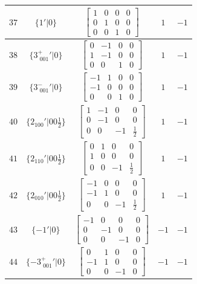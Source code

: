\documentclass[fleqn,8pt]{jsarticle}
\begin{document}
\begin{longtable}{ccccc}
$ 37 $ & $ \{1{}'|0\} $ & $ \begin{bmatrix} 1 & 0 & 0 & 0 \\ 0 & 1 & 0 & 0 \\ 0 & 0 & 1 & 0 \end{bmatrix} $ & $ 1 $ & $ -1 $ \\ \hline
$ 38 $ & $ \{3^{+}_{\,\,001}{}'|0\} $ & $ \begin{bmatrix} 0 & -1 & 0 & 0 \\ 1 & -1 & 0 & 0 \\ 0 & 0 & 1 & 0 \end{bmatrix} $ & $ 1 $ & $ -1 $ \\ \hline
$ 39 $ & $ \{3^{-}_{\,\,001}{}'|0\} $ & $ \begin{bmatrix} -1 & 1 & 0 & 0 \\ -1 & 0 & 0 & 0 \\ 0 & 0 & 1 & 0 \end{bmatrix} $ & $ 1 $ & $ -1 $ \\ \hline
$ 40 $ & $ \{2{}_{100}{}'|0 0 \frac{1}{2}\} $ & $ \begin{bmatrix} 1 & -1 & 0 & 0 \\ 0 & -1 & 0 & 0 \\ 0 & 0 & -1 & \frac{1}{2} \end{bmatrix} $ & $ 1 $ & $ -1 $ \\ \hline
$ 41 $ & $ \{2{}_{110}{}'|0 0 \frac{1}{2}\} $ & $ \begin{bmatrix} 0 & 1 & 0 & 0 \\ 1 & 0 & 0 & 0 \\ 0 & 0 & -1 & \frac{1}{2} \end{bmatrix} $ & $ 1 $ & $ -1 $ \\ \hline
$ 42 $ & $ \{2{}_{010}{}'|0 0 \frac{1}{2}\} $ & $ \begin{bmatrix} -1 & 0 & 0 & 0 \\ -1 & 1 & 0 & 0 \\ 0 & 0 & -1 & \frac{1}{2} \end{bmatrix} $ & $ 1 $ & $ -1 $ \\ \hline
$ 43 $ & $ \{-1{}'|0\} $ & $ \begin{bmatrix} -1 & 0 & 0 & 0 \\ 0 & -1 & 0 & 0 \\ 0 & 0 & -1 & 0 \end{bmatrix} $ & $ -1 $ & $ -1 $ \\ \hline
$ 44 $ & $ \{-3^{+}_{\,\,001}{}'|0\} $ & $ \begin{bmatrix} 0 & 1 & 0 & 0 \\ -1 & 1 & 0 & 0 \\ 0 & 0 & -1 & 0 \end{bmatrix} $ & $ -1 $ & $ -1 $ \\ \hline

\end{longtable}
\end{document}
